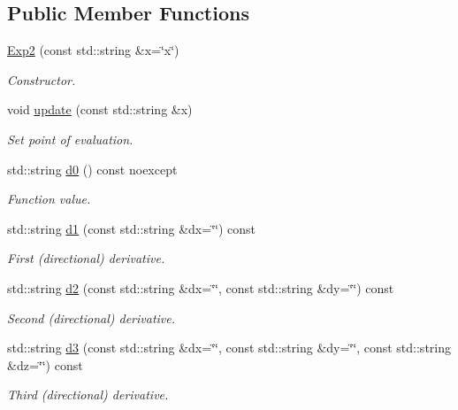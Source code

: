 \subsection*{Public Member Functions}
\begin{DoxyCompactItemize}
\item 
\hyperlink{structFunG_1_1texify_1_1Exp2_a6b57152cf70e74701f720965c613bbae}{Exp2} (const std\-::string \&x=\char`\"{}x\char`\"{})
\begin{DoxyCompactList}\small\item\em Constructor. \end{DoxyCompactList}\item 
void \hyperlink{structFunG_1_1texify_1_1Exp2_a6974ebc03352e60aa1051e68ace44c4e}{update} (const std\-::string \&x)
\begin{DoxyCompactList}\small\item\em Set point of evaluation. \end{DoxyCompactList}\item 
std\-::string \hyperlink{structFunG_1_1texify_1_1Exp2_a7a59e0578272b13a9eca5c570e988946}{d0} () const noexcept
\begin{DoxyCompactList}\small\item\em Function value. \end{DoxyCompactList}\item 
std\-::string \hyperlink{structFunG_1_1texify_1_1Exp2_a842212da4f9684aff19b1f02777d27e4}{d1} (const std\-::string \&dx=\char`\"{}\char`\"{}) const 
\begin{DoxyCompactList}\small\item\em First (directional) derivative. \end{DoxyCompactList}\item 
std\-::string \hyperlink{structFunG_1_1texify_1_1Exp2_a2da97ece074e43301dd9c49568782fa2}{d2} (const std\-::string \&dx=\char`\"{}\char`\"{}, const std\-::string \&dy=\char`\"{}\char`\"{}) const 
\begin{DoxyCompactList}\small\item\em Second (directional) derivative. \end{DoxyCompactList}\item 
std\-::string \hyperlink{structFunG_1_1texify_1_1Exp2_acef5ff4d530388c59bd76ab1c6329776}{d3} (const std\-::string \&dx=\char`\"{}\char`\"{}, const std\-::string \&dy=\char`\"{}\char`\"{}, const std\-::string \&dz=\char`\"{}\char`\"{}) const 
\begin{DoxyCompactList}\small\item\em Third (directional) derivative. \end{DoxyCompactList}\end{DoxyCompactItemize}



